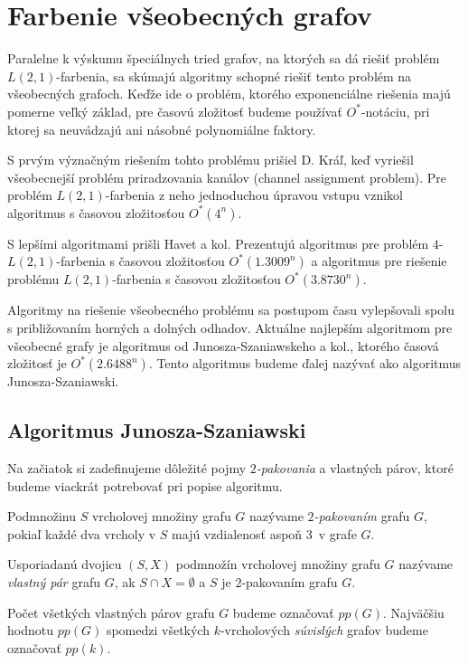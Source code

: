 \section{Farbenie všeobecných grafov}

Paralelne k výskumu špeciálnych tried grafov, na ktorých sa dá riešiť problém $L(2,1)$-farbenia,
sa skúmajú algoritmy schopné riešiť tento problém na všeobecných grafoch. Keďže ide o problém,
ktorého exponenciálne riešenia majú pomerne veľký základ, pre časovú zložitosť budeme používať
$O^*$-notáciu, pri ktorej sa neuvádzajú ani násobné polynomiálne faktory.

S prvým význačným riešením tohto problému prišiel D. Kráľ, keď vyriešil všeobecnejší problém
priradzovania kanálov (channel assignment problem). Pre problém $L(2,1)$-farbenia z neho 
jednoduchou úpravou vstupu vznikol algoritmus s časovou zložitosťou $O^*(4^n)$\cite{kral_channel}.

S lepšími algoritmami prišli Havet a kol. Prezentujú algoritmus pre problém $4$-$L(2,1)$-farbenia
s časovou zložitosťou $O^*(1.3009^n)$ a algoritmus pre riešenie problému $L(2,1)$-farbenia s
časovou zložitosťou $O^*(3.8730^n)$.

Algoritmy na riešenie všeobecného problému sa postupom času vylepšovali spolu s približovaním
horných a dolných odhadov. Aktuálne najlepším algoritmom pre všeobecné grafy je algoritmus
od Junosza-Szaniawskeho a kol., ktorého časová zložitosť je $O^*(2.6488^n)$\cite{junosza_fast}.
Tento algoritmus budeme ďalej nazývať ako algoritmus Junosza-Szaniawski.

\subsection{Algoritmus Junosza-Szaniawski}

Na začiatok si zadefinujeme dôležité pojmy $2$\emph{-pakovania} a vlastných párov, ktoré budeme
viackrát potrebovať pri popise algoritmu.

\begin{defn}
    Podmnožinu $S$ vrcholovej množiny grafu $G$ nazývame $2$\emph{-pakovaním} grafu $G$, pokiaľ každé
    dva vrcholy v $S$ majú vzdialenosť aspoň $3$ v grafe $G$.
\end{defn}

\begin{defn}
    Usporiadanú dvojicu $(S, X)$ podmnožín vrcholovej množiny grafu $G$ nazývame \emph{vlastný pár}
    grafu $G$, ak $S \cap X = \emptyset$ a $S$ je $2$-pakovaním grafu $G$.

    Počet všetkých vlastných párov grafu $G$ budeme označovať $pp(G)$. Najväčšiu hodnotu $pp(G)$
    spomedzi všetkých $k$-vrcholových \emph{súvislých} grafov budeme označovať $pp(k)$.
\end{defn}

